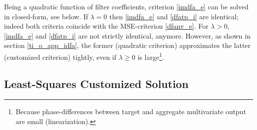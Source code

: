 \documentclass[a4paper]{book}
\begin{document}
Being a quadratic function of filter coefficients, criterion \ref{imdfa_e} can be solved in closed-form, see below.
If $\lambda=0$ then \ref{imdfa_e} and \ref{dfatp_i} are identical; indeed both criteria coincide with the MSE-criterion \ref{dfanv_e}. For $\lambda>0$, \ref{imdfa_e} and \ref{dfatp_i} are not strictly identical, anymore. However, as shown in section \ref{ti_o_app_idfa}, the former (quadratic criterion) approximates the latter (customized criterion) tightly, even if $\lambda\geq 0$ is large\footnote{Because phase-differences between target and aggregate multivariate output  are small (linearization).}. 






\subsection{Least-Squares Customized Solution}\label{l-scsmdfa}
\end{document}
